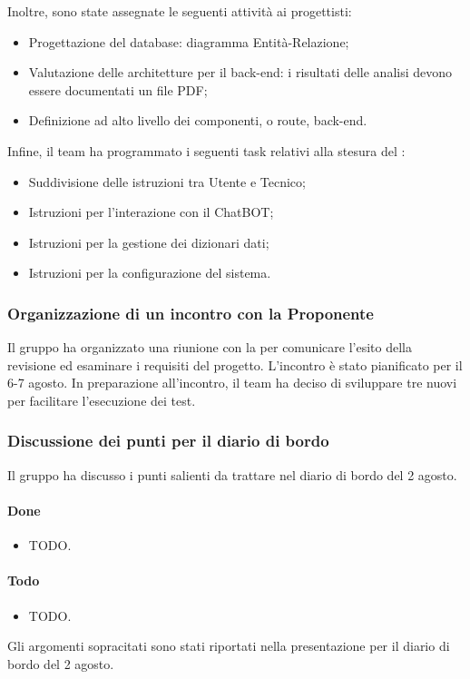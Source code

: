 \vspace{0.5\baselineskip}
\par Inoltre, sono state assegnate le seguenti attività ai progettisti:
\begin{itemize}
	\item Progettazione del database: diagramma Entità-Relazione;
	\item Valutazione delle architetture per il back-end: i risultati delle analisi devono essere documentati un file PDF;
	\item Definizione ad alto livello dei componenti, o route, back-end.
\end{itemize}

\vspace{0.5\baselineskip}
\par Infine, il team ha programmato i seguenti task relativi alla stesura del \ManualeUtente{}:
\begin{itemize}
	\item Suddivisione delle istruzioni tra Utente e Tecnico;
	\item Istruzioni per l'interazione con il ChatBOT;
	\item Istruzioni per la gestione dei dizionari dati;
	\item Istruzioni per la configurazione del sistema.
\end{itemize}

\subsubsection{Organizzazione di un incontro con la Proponente}
\par Il gruppo ha organizzato una riunione con la  per comunicare l'esito della revisione  ed esaminare i requisiti del progetto. L'incontro è stato pianificato per il 6-7 agosto. In preparazione all'incontro, il team ha deciso di sviluppare tre nuovi  per facilitare l'esecuzione dei test.

\subsubsection{Discussione dei punti per il diario di bordo}
\par Il gruppo ha discusso i punti salienti da trattare nel diario di bordo del 2 agosto.
\paragraph{Done}
\begin{itemize}
	\item TODO.
\end{itemize}

\paragraph{Todo}
\begin{itemize}
	\item TODO.
\end{itemize}

\vspace{0.5\baselineskip}
\par Gli argomenti sopracitati sono stati riportati nella presentazione per il diario di bordo del 2 agosto.